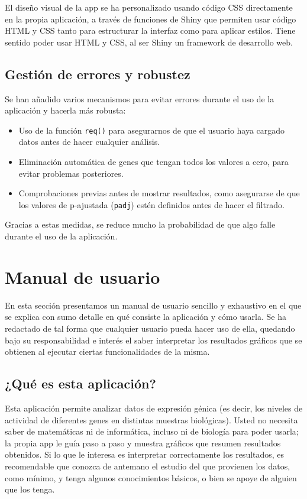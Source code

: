 El diseño visual de la app se ha personalizado usando código CSS directamente en la propia aplicación, a
través de funciones de Shiny que permiten usar código HTML y CSS tanto para estructurar la interfaz como para aplicar estilos. Tiene sentido 
poder usar HTML y CSS, al ser Shiny un framework de desarrollo web.


\subsection{Gestión de errores y robustez}

Se han añadido varios mecanismos para evitar errores durante el uso de la aplicación y hacerla más robusta:

\begin{itemize}
    \item Uso de la función \texttt{req()} para asegurarnos de que el usuario haya cargado datos antes de hacer cualquier análisis.
    \item Eliminación automática de genes que tengan todos los valores a cero, para evitar problemas posteriores.
    \item Comprobaciones previas antes de mostrar resultados, como asegurarse de que los valores de p-ajustada (\texttt{padj}) estén 
    definidos antes de hacer el filtrado.
\end{itemize}

Gracias a estas medidas, se reduce mucho la probabilidad de que algo falle durante el uso de la aplicación.


\section{Manual de usuario}

En esta sección presentamos un manual de usuario sencillo y exhaustivo en el que se explica con sumo detalle en qué consiste la aplicación 
y cómo usarla. Se ha redactado de tal forma que cualquier usuario pueda hacer uso de ella, quedando bajo su responsabilidad e interés el saber interpretar 
los resultados gráficos que se obtienen al ejecutar ciertas funcionalidades de la misma. \newline

\subsection{¿Qué es esta aplicación?}

Esta aplicación permite analizar datos de expresión génica (es decir, los niveles de actividad de diferentes genes en distintas muestras 
biológicas). Usted no necesita saber de matemáticas ni de informática, incluso ni de biología para poder usarla; la propia app le guía paso a paso y muestra gráficos que resumen 
resultados obtenidos. Si lo que le interesa es interpretar correctamente los resultados, es recomendable que conozca de antemano el estudio del que provienen los datos, 
como mínimo, y tenga algunos
conocimientos básicos, o bien se apoye de alguien que los tenga.


